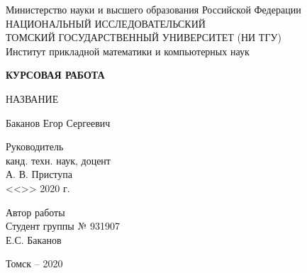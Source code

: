 ﻿\begin{titlepage}
    \begin{center}

        \begin{singlespace}
            \large
            Министерство науки и высшего образования Российской Федерации \\
            НАЦИОНАЛЬНЫЙ ИССЛЕДОВАТЕЛЬСКИЙ \\
            ТОМСКИЙ ГОСУДАРСТВЕННЫЙ УНИВЕРСИТЕТ (НИ ТГУ) \\
            Институт прикладной математики и компьютерных наук 
            \par
        \end{singlespace}
        \vspace{6cm}

        \begin{doublespace}
            {\bf
                КУРСОВАЯ РАБОТА
                \par
            }
            НАЗВАНИЕ
            \par
            Баканов Егор Сергеевич 
            \par
        \end{doublespace}
        \vspace{4cm}

        \hfill
        \begin{minipage}{5cm}
            \begin{singlespace}
                Руководитель \\
                канд. техн. наук, доцент \\
                А. В. Приступа \\
                <<\emptyunderline{.8cm}>>
                \emptyunderline{1.6cm}
                2020 г.
                \par
                Автор работы \\
                Студент группы № 931907 \\
                Е.С. Баканов
                \par
            \end{singlespace}
        \end{minipage}
        \vfill

        {\normalsize
            Томск -- 2020
            \par
        }
    \end{center}
\end{titlepage}